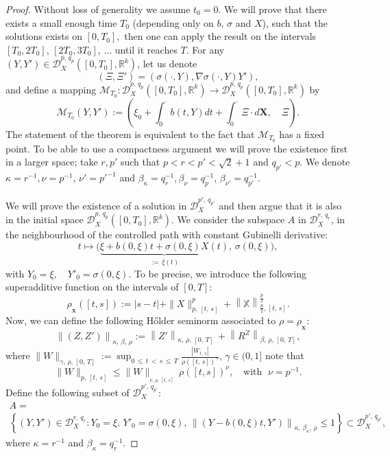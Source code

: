 \documentclass[10pt]{amsart}
\theoremstyle{definition}\newtheorem{defi}[theo]{Definition}\newtheorem{rema}[theo]{Remark}\newtheorem{exam}[theo]{Example}\newtheorem{exem}[theo]{Example}\newtheorem{nota}[theo]{Notation}
\newcommand{\bfX}{\mathbf{X}}
\newcommand{\scrD}{\mathscr{D}}
\newcommand{\bbX}{\mathbb{X}}
\newcommand{\calM}{\mathcal{M}}
\newcommand{\Rr}{{\mathbb{R}}}
\begin{document}
\begin{proof}
Without loss of generality we assume $t_0=0.$ We will prove that there exists a small enough time $T_0$ (depending only on $b,\,\sigma$ and $X$), such that the solutions exists on $[0,T_0],$ then one can apply the result on the intervals $[T_0,2T_0],\, [2T_0, 3T_0],\,\ldots$ until it reaches $T$. For any $(Y,Y')\in\scrD^{p,\,q_p}_{X}([0, T_0],\Rr^k)$, let us denote
\[
\left(\Xi,\Xi'\right)=\left(\sigma(\cdot,Y), \nabla \sigma(\cdot,Y) Y'\right),
\]
and define a mapping $\calM_{T_0}\colon \scrD^{p,\,q_p}_{X}([0, T_0],\Rr^k)\to \scrD^{p,\,q_p}_{X}([0, T_0],\Rr^k)$ by
\[
\calM_{T_0}\left(Y,Y'\right):=\left(\xi_0+\int_0^{\cdot} b(t, Y)dt+\int_0^{\cdot} \Xi\cdot d\bm{X},\quad \Xi\right).
\]
The statement of the theorem is equivalent to the fact that $\calM_{T_0}$ has a fixed point. To be able to use a compactness argument we will prove the existence first in a larger space; take $r, p'$ such that $p<r<p'<\sqrt{2}+1$ and $q_{p'}<p.$ We denote $\kappa=r^{-1}, \nu=p^{-1}$, $\nu'=p'^{-1}$ and $\beta_\kappa=q_r^{-1}, \beta_\nu=q_p^{-1}$, $\beta_{\nu'}=q_{p'}^{-1}.$

We will prove the existence of a solution in $\scrD^{p',\,q_{p'}}_{X }$ and then argue that it is also in the initial space $ \scrD^{p,\,q_p}_{X }([0, T_0],\Rr^k)$. We consider the subspace $A$ in $\scrD^{r,\,q_{r}}_{X}$, in the neighbourhood of the controlled path with constant Gubinelli derivative:
\[
t\mapsto \big(\underbrace{\xi+b(0,\xi) t+\sigma(0, \xi)X(t)}_{:=\,\bar{\xi}(t)},\, \sigma(0,\xi)\big),
\]
with $Y_0=\xi,\quad Y'_0=\sigma(0,\xi)$. To be precise, we introduce the following superadditive function on the intervals of $[0,T]$:
\[
\rho_{_\bfX}([t,s]):=|s-t|+\|X\|_{p,\,[t,\,s]}^p+\left\|\bbX\right\|_{\frac{p}{2},\,[t,\,s]}^{\frac p 2}.
\]
Now, we can define the following H\H older seminorm associated to $\rho=\rho_{_\bfX}$:
\[
\left\|\left(Z, Z'\right)\right\|_{\kappa,\,\beta,\,\rho}:=\left\|Z'\right\|_{\kappa,\,\rho,\, [0,\,T]}\,+\left\|R^Z\right\|_{\beta,\,\rho,\, [0,\,T]},
\]
where $\|W\|_{\gamma,\,\rho,\,[0,\,T]}:=\sup_{0\,\leq\,t\,<\,s\,\leq\,T} \frac{|W_{t,\,s}|}{\rho([t,\,s])^{\gamma}},\, \gamma\in (0, 1]$ note that
\[
\|W\|_{p,\,[t,\,s]} \leq \|W\|_{_{\nu,\,\rho,\,[t,\,s]}}\, \rho([t,s])^{\nu},\quad \text{
with }\;\nu=p^{-1}.
\]
Define the following subset of $\scrD^{p',\,q_{p'}}_{X }$:
\begin{multline}\label{eq.setA}
A=\\
\left\{\left(Y,Y'\right)\in\scrD^{r,\,q_{r}}_{X}\colon Y_0=\xi,\, Y'_0=\sigma(0,\xi),\, \left\|\left(Y-b(0,\xi) t,Y'\right)\right\|_{\kappa,\, \beta_{\kappa},\,\rho}\leq 1\right\} \subset \scrD^{p',\,q_{p'}}_{X}, 
\end{multline}
where $\kappa=r^{-1}$ and $\beta_\kappa=q_r^{-1}$.


\end{proof}
\end{document}
